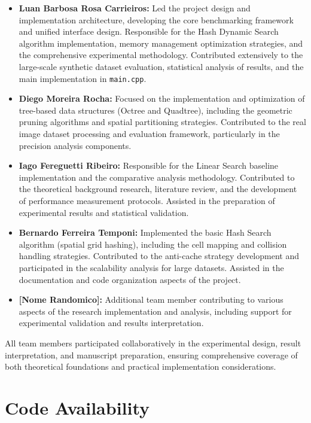 \documentclass{sbc2023}
\begin{document}
\begin{itemize}
    \item \textbf{Luan Barbosa Rosa Carrieiros:} Led the project design and implementation architecture, developing the core benchmarking framework and unified interface design. Responsible for the Hash Dynamic Search algorithm implementation, memory management optimization strategies, and the comprehensive experimental methodology. Contributed extensively to the large-scale synthetic dataset evaluation, statistical analysis of results, and the main implementation in \texttt{main.cpp}.
    
    \item \textbf{Diego Moreira Rocha:} Focused on the implementation and optimization of tree-based data structures (Octree and Quadtree), including the geometric pruning algorithms and spatial partitioning strategies. Contributed to the real image dataset processing and evaluation framework, particularly in the precision analysis components.
    
    \item \textbf{Iago Fereguetti Ribeiro:} Responsible for the Linear Search baseline implementation and the comparative analysis methodology. Contributed to the theoretical background research, literature review, and the development of performance measurement protocols. Assisted in the preparation of experimental results and statistical validation.
    
    \item \textbf{Bernardo Ferreira Temponi:} Implemented the basic Hash Search algorithm (spatial grid hashing), including the cell mapping and collision handling strategies. Contributed to the anti-cache strategy development and participated in the scalability analysis for large datasets. Assisted in the documentation and code organization aspects of the project.
    
    \item \textbf{[Nome Randomico]:} Additional team member contributing to various aspects of the research implementation and analysis, including support for experimental validation and results interpretation.
\end{itemize}

All team members participated collaboratively in the experimental design, result interpretation, and manuscript preparation, ensuring comprehensive coverage of both theoretical foundations and practical implementation considerations.

\section*{Code Availability}
\label{sec:code_availability}
\end{document}
